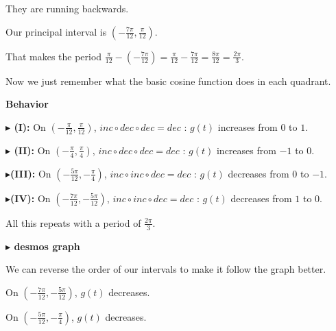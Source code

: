 \documentclass{ximera}
\begin{document}
\begin{example}
They are running backwards.

Our principal interval is $\left( -\frac{7\pi}{12}, \frac{\pi}{12} \right)$.

That makes the period $\frac{\pi}{12} - \left( -\frac{7\pi}{12} \right) = \frac{\pi}{12} -\frac{7\pi}{12} = \frac{8\pi}{12} = \frac{2\pi}{3}$.


Now we just remember what the basic cosine function does in each quadrant. 






\textbf{\textcolor{blue!55!black}{Behavior}} 



\textbf{\textcolor{blue!55!black}{$\blacktriangleright$ (I):}} On $\left( -\frac{\pi}{12}, \frac{\pi}{12} \right)$, $inc \circ dec \circ dec = dec$ : $g(t)$ increases from $0$ to $1$.



\textbf{\textcolor{blue!55!black}{$\blacktriangleright$ (II):}} On $\left( -\frac{\pi}{4}, \frac{\pi}{4} \right)$, $inc \circ dec \circ dec = dec$ : $g(t)$ increases from $-1$ to $0$.



\textbf{\textcolor{blue!55!black}{$\blacktriangleright$(III):}} On $\left( -\frac{5\pi}{12}, -\frac{\pi}{4} \right)$, $inc \circ inc \circ dec = dec$ : $g(t)$ decreases from $0$ to $-1$.


\textbf{\textcolor{blue!55!black}{$\blacktriangleright$(IV):}} On $\left( -\frac{7\pi}{12}, -\frac{5\pi}{12} \right)$, $inc \circ inc \circ dec = dec$ : $g(t)$ decreases from $1$ to $0$.



All this repeats with a period of $\frac{2\pi}{3}$.









\textbf{\textcolor{blue!55!black}{$\blacktriangleright$ desmos graph}} 
\begin{center}
\end{center}




We can reverse the order of our intervals to make it follow the graph better.

On $\left( -\frac{7\pi}{12}, -\frac{5\pi}{12} \right)$, $g(t)$ decreases.

On $\left( -\frac{5\pi}{12}, -\frac{\pi}{4} \right)$, $g(t)$ decreases.


\end{example}
\end{document}
